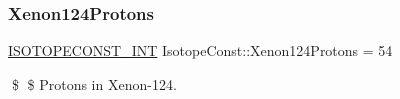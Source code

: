 \subsubsection{\texorpdfstring{Xenon124\+Protons}{Xenon124Protons}}
{\footnotesize\ttfamily \mbox{\hyperlink{group___isotope_const-_macros_ga5f18360b3e99483a35c32d789e62621c}{I\+S\+O\+T\+O\+P\+E\+C\+O\+N\+S\+T\+\_\+\+I\+NT}} Isotope\+Const\+::\+Xenon124\+Protons = 54}

\$ \$ Protons in Xenon-\/124. 